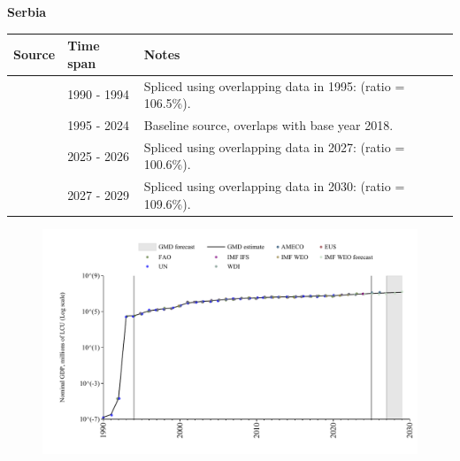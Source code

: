 \documentclass[12pt,a4paper,landscape]{article}
\begin{document}
\begin{adjustbox}{max totalsize={\paperwidth}{\paperheight},center}
\begin{minipage}[t][\textheight][t]{\textwidth}
\vspace*{0.5cm}
{}
\begin{center}
{\Large\bfseries Serbia}
\end{center}
\vspace{0.5cm}
\begin{table}[H]
\centering
\small
\begin{tabular}{|l|l|l|}
\hline
\textbf{Source} & \textbf{Time span} & \textbf{Notes} \\
\hline
\rowcolor{white}\cite{UN}& 1990 - 1994 &Spliced using overlapping data in 1995: (ratio = 106.5\%).\\
\rowcolor{lightgray}\cite{EUS}& 1995 - 2024 &Baseline source, overlaps with base year 2018.\\
\rowcolor{white}\cite{AMECO}& 2025 - 2026 &Spliced using overlapping data in 2027: (ratio = 100.6\%).\\
\rowcolor{lightgray}\cite{IMF_WEO_forecast}& 2027 - 2029 &Spliced using overlapping data in 2030: (ratio = 109.6\%).\\
\hline
\end{tabular}
\end{table}
\begin{figure}[H]
\centering
\includegraphics[width=\textwidth,height=0.6\textheight,keepaspectratio]{graphs/SRB_nGDP.pdf}
\end{figure}
\end{minipage}
\end{adjustbox}
\end{document}
